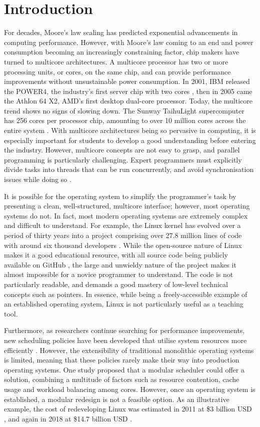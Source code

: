 \documentclass[bsc,frontabs,singlespacing,parskip,deptreport]{infthesis}
\begin{document}
\chapter{Introduction}
For decades, Moore’s law scaling has predicted exponential advancements in computing performance. However, with Moore’s law coming to an end and power consumption becoming an increasingly constraining factor, chip makers have turned to multicore architectures. A multicore processor has two or more processing units, or cores, on the same chip, and can provide performance improvements without unsustainable power consumption. In 2001, IBM released the POWER4, the industry’s first server chip with two cores \cite{power4}, then in 2005 came the Athlon 64 X2, AMD’s first desktop dual-core processor. Today, the multicore trend shows no signs of slowing down. The Sunway TaihuLight supercomputer has 256 cores per processor chip, amounting to over 10 million cores across the entire system \cite{sunway}. With multicore architectures being so pervasive in computing, it is especially important for students to develop a good understanding before entering the industry. However, multicore concepts are not easy to grasp, and parallel programming is particularly challenging. Expert programmers must explicitly divide tasks into threads that can be run concurrently, and avoid synchronisation issues while doing so \cite{geer}. 

It is possible for the operating system to simplify the programmer's task by presenting a clean, well-structured, multicore interface; however, most operating systems do not. In fact, most modern operating systems are extremely complex and difficult to understand. For example, the Linux kernel has evolved over a period of thirty years into a project comprising over 27.8 million lines of code \cite{linux-loc} with around six thousand developers \cite{linux-kernel}. While the open-source nature of Linux makes it a good educational resource, with all source code being publicly available on GitHub \cite{linux-github}, the large and unwieldy nature of the project makes it almost impossible for a novice programmer to understand. The code is not particularly readable, and demands a good mastery of low-level technical concepts such as pointers. In essence, while being a freely-accessible example of an established operating system, Linux is not particularly useful as a teaching tool. 

Furthermore, as researchers continue searching for performance improvements, new scheduling policies have been developed that utilise system resources more efficiently \cite{wasted-cores}. However, the extensibility of traditional monolithic operating systems is limited, meaning that these policies rarely make their way into production operating systems. One study proposed that a modular scheduler could offer a solution, combining a multitude of factors such as resource contention, cache usage and workload balancing among cores. However, once an operating system is established, a modular redesign is not a feasible option. As an illustrative example, the cost of redeveloping Linux was estimated in 2011 at \$3 billion USD \cite{linux-kernel-cost}, and again in 2018 at \$14.7 billion USD \cite{cost-to-redev}. 
\end{document}
